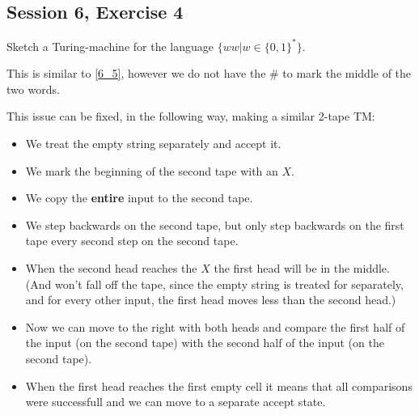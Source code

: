 \subsection {Session 6, Exercise 4}


Sketch a Turing-machine for the language $\{ww | w \in \{0,1\}^*\}$.


This is similar to \ref{6_5}, however we do not have the $\#$ to mark the middle of the two words.

This issue can be fixed, in the following way, making a similar 2-tape TM:

\begin{itemize}
    \item We treat the empty string separately and accept it.
    \item We mark the beginning of the second tape with an $X$.
    \item We copy the \textbf{entire} input to the second tape.
    \item We step backwards on the second tape, but only step backwards on the first tape every second step on the second tape.
    \item When the second head reaches the $X$ the first head will be in the middle. (And won't fall off the tape, since the empty string is treated for separately, and for every other input, the first head moves less than the second head.)
    \item Now we can move to the right with both heads and compare the first half of the input (on the second tape) with the second half of the input (on the second tape).
    \item When the first head reaches the first empty cell it means that all comparisons were successfull and we can move to a separate accept state.
\end{itemize}